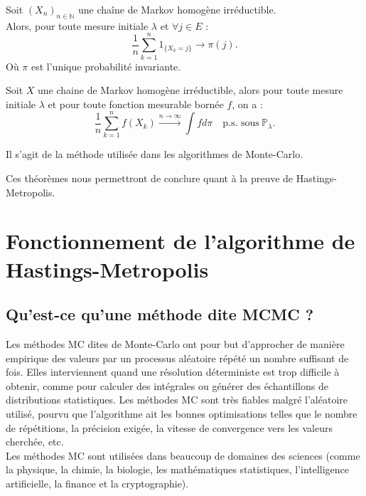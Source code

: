 \documentclass{article}
\begin{document}
\begin{tcolorbox}[colback=white,colframe=red!80!black,title=Valeur de convergence]
Soit $(X_n)_{n \in \mathbb{N}}$ une chaîne de Markov homogène irréductible. \\

Alors, pour toute mesure initiale $\lambda$ et $\forall j \in E$ :
\[
\frac{1}{n} \sum_{k=1}^{n} 1_{\{X_k = j\}} \rightarrow \pi(j).
\]
Où $\pi$ est l'unique probabilité invariante.
\end{tcolorbox}

\begin{tcolorbox}[colback=white,colframe=blue!80!black,title=Convergence des méthodes de Monte-Carlo]
Soit $X$ une chaine de Markov homogène irréductible, alors pour toute mesure initiale $\lambda$ et pour toute fonction mesurable bornée $f$, on a :
\[
\frac{1}{n} \sum_{k=1}^{n} f(X_k) \xrightarrow{n \to \infty} \int f d\pi \quad \text{p.s. sous} \ \mathbb{P}_\lambda.
\]

Il s'agit de la méthode utilisée dans les algorithmes de Monte-Carlo.
\end{tcolorbox}
  
Ces théorèmes nous permettront de conclure quant à la preuve de Hastings-Metropolis.

\newpage %
\section{Fonctionnement de l'algorithme de Hastings-Metropolis}

\subsection{Qu'est-ce qu'une méthode dite MCMC ?}

Les méthodes MC dites de Monte-Carlo ont pour but d'approcher de manière empirique des valeurs par un processus aléatoire répété un nombre suffisant de fois. Elles interviennent quand une résolution déterministe est trop difficile à obtenir, comme pour calculer des intégrales ou générer des échantillons de distributions statistiques. Les méthodes MC sont très fiables malgré l'aléatoire utilisé, pourvu que l'algorithme ait les bonnes optimisations telles que le nombre de répétitions, la précision exigée, la vitesse de convergence vers les valeurs cherchée, etc. \\
Les méthodes MC sont utilisées dans beaucoup de domaines des sciences (comme la physique, la chimie, la biologie, les mathématiques statistiques, l'intelligence artificielle, la finance et la cryptographie). \\
\end{document}
